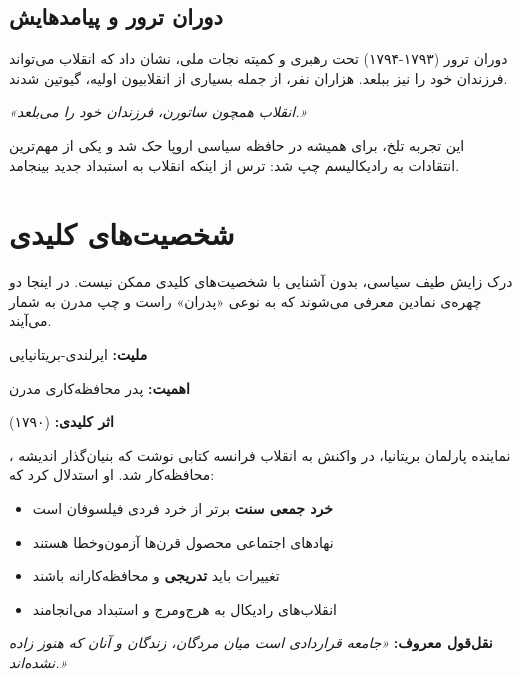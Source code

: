 \subsection{دوران ترور و پیامدهایش}

دوران ترور (۱۷۹۳-۱۷۹۴) تحت رهبری  و کمیته نجات ملی، نشان داد که انقلاب می‌تواند فرزندان خود را نیز ببلعد. هزاران نفر، از جمله بسیاری از انقلابیون اولیه، گیوتین شدند.

\begin{quotebox}
\textit{«انقلاب همچون ساتورن، فرزندان خود را می‌بلعد.»}
\end{quotebox}

این تجربه تلخ، برای همیشه در حافظه سیاسی اروپا حک شد و یکی از مهم‌ترین انتقادات به رادیکالیسم چپ شد: ترس از اینکه انقلاب به استبداد جدید بینجامد.

\section{شخصیت‌های کلیدی}

درک زایش طیف سیاسی، بدون آشنایی با شخصیت‌های کلیدی ممکن نیست. در اینجا دو چهره‌ی نمادین معرفی می‌شوند که به نوعی «پدران» راست و چپ مدرن به شمار می‌آیند.

\begin{personbox}

\textbf{ملیت:} ایرلندی-بریتانیایی

\textbf{اهمیت:} پدر محافظه‌کاری مدرن

\textbf{اثر کلیدی:}  (۱۷۹۰)

\mediumspace

، نماینده پارلمان بریتانیا، در واکنش به انقلاب فرانسه کتابی نوشت که بنیان‌گذار اندیشه محافظه‌کار شد. او استدلال کرد که:

\begin{itemize}[nosep, rightmargin=0.5cm]
    \item \textbf{خرد جمعی سنت} برتر از خرد فردی فیلسوفان است
    \item نهادهای اجتماعی محصول قرن‌ها آزمون‌وخطا هستند
    \item تغییرات باید \textbf{تدریجی} و محافظه‌کارانه باشند
    \item انقلاب‌های رادیکال به هرج‌ومرج و استبداد می‌انجامند
\end{itemize}

\mediumspace

\textbf{نقل‌قول معروف:} \textit{«جامعه قراردادی است میان مردگان، زندگان و آنان که هنوز زاده نشده‌اند.»}
\end{personbox}


